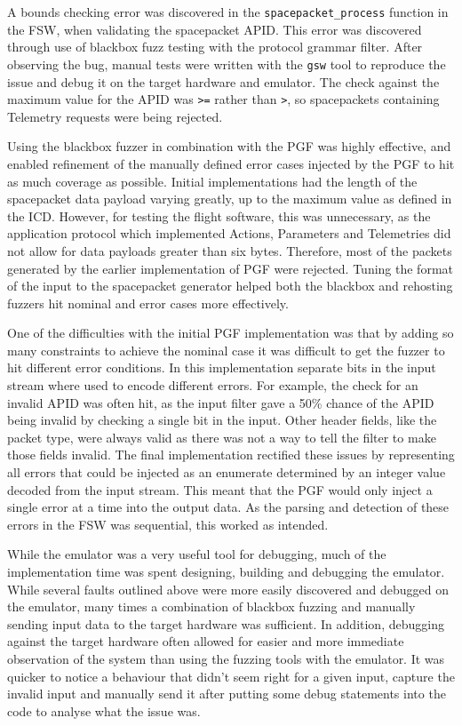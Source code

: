 \documentclass[../report.tex]{subfiles}
\begin{document}
A bounds checking error was discovered in the \lstinline|spacepacket_process|
function in the FSW, when validating the spacepacket APID. This error was
discovered through use of blackbox fuzz testing with the protocol grammar
filter. After observing the bug, manual tests were written with the
\lstinline|gsw| tool to reproduce the issue and debug it on the target hardware
and emulator. The check against the maximum value for the APID was
\lstinline|>=| rather than \lstinline|>|, so spacepackets containing Telemetry
requests were being rejected.

Using the blackbox fuzzer in combination with the PGF was highly effective, and
enabled refinement of the manually defined error cases injected by the PGF to
hit as much coverage as possible. Initial implementations had the length of the
spacepacket data payload varying greatly, up to the maximum value as defined in
the ICD. However, for testing the flight software, this was unnecessary, as the
application protocol which implemented Actions, Parameters and Telemetries did
not allow for data payloads greater than six bytes. Therefore, most of the
packets generated by the earlier implementation of PGF were rejected. Tuning
the format of the input to the spacepacket generator helped both the blackbox
and rehosting fuzzers hit nominal and error cases more effectively.

One of the difficulties with the initial PGF implementation was that by adding
so many constraints to achieve the nominal case it was difficult to get the
fuzzer to hit different error conditions. In this implementation separate bits
in the input stream where used to encode different errors. For example, the
check for an invalid APID was often hit, as the input filter gave a 50\% chance
of the APID being invalid by checking a single bit in the input. Other header
fields, like the packet type, were always valid as there was not a way to tell
the filter to make those fields invalid. The final implementation rectified
these issues by representing all errors that could be injected as an enumerate
determined by an integer value decoded from the input stream. This meant that
the PGF would only inject a single error at a time into the output data. As the
parsing and detection of these errors in the FSW was sequential, this worked as
intended.

While the emulator was a very useful tool for debugging, much of the
implementation time was spent designing, building and debugging the emulator.
While several faults outlined above were more easily discovered and debugged on
the emulator, many times a combination of blackbox fuzzing and manually sending
input data to the target hardware was sufficient. In addition, debugging
against the target hardware often allowed for easier and more immediate
observation of the system than using the fuzzing tools with the emulator. It
was quicker to notice a behaviour that didn't seem right for a given input,
capture the invalid input and manually send it after putting some debug
statements into the code to analyse what the issue was.
\end{document}
